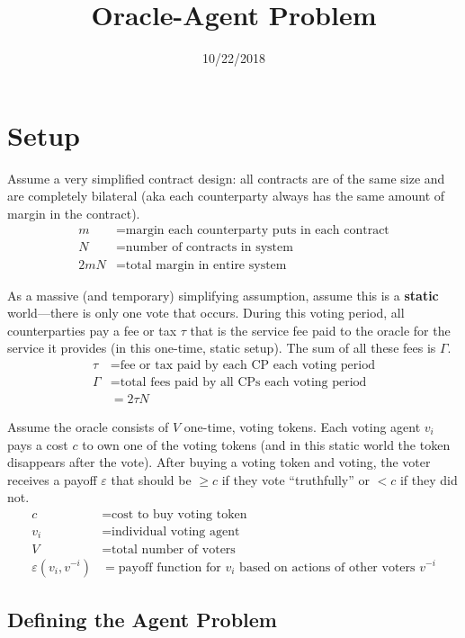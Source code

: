 \documentclass[12pt]{article}
\title{Oracle-Agent Problem}
\date{10/22/2018}
\begin{document}
\maketitle

\section{Setup}

Assume a very simplified contract design: all contracts are of the same size and are completely bilateral (aka each counterparty always has the same amount of margin in the contract). 
\begin{align*}
m &= \text{margin each counterparty puts in each contract}\\
N &= \text{number of contracts in system}\\
2mN &= \text{total margin in entire system}
\end{align*}

As a massive (and temporary) simplifying assumption, assume this is a \textbf{static} world---there is only one vote that occurs. During this voting period, all counterparties pay a fee or tax $\tau$ that is the service fee paid to the oracle for the service it provides (in this one-time, static setup). The sum of all these fees is $\Gamma$. 
\begin{align*}
\tau &= \text{fee or tax paid by each CP each voting period}\\
\Gamma &= \text{total fees paid by all CPs each voting period}\\
       &= 2 \tau N
\end{align*}

Assume the oracle consists of $V$ one-time, voting tokens. Each voting agent $v_i$ pays a cost $c$ to own one of the voting tokens (and in this static world the token disappears after the vote). After buying a voting token and voting, the voter receives a payoff $\varepsilon$ that should be $\geq c$ if they vote ``truthfully'' or $<c$ if they did not.
\begin{align*}
c &= \text{cost to buy voting token}\\
v_i &= \text{individual voting agent}\\
V &= \text{total number of voters}\\
\varepsilon (v_i, v^{-i}) &= \text{payoff function for $v_i$ based on actions of other voters $v^{-i}$}
\end{align*}

\subsection{Defining the Agent Problem}
\end{document}
